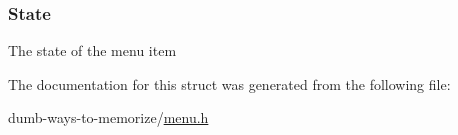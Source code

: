 \subsubsection[{\texorpdfstring{State}{State}}]{ State}\hypertarget{structmenu__item__s_a549a5400c9f9b61bb66d0239bd21fe53}{}\label{structmenu__item__s_a549a5400c9f9b61bb66d0239bd21fe53}
The state of the menu item 

The documentation for this struct was generated from the following file\+:\begin{DoxyCompactItemize}
\item 
dumb-\/ways-\/to-\/memorize/\hyperlink{menu_8h}{menu.\+h}\end{DoxyCompactItemize}

